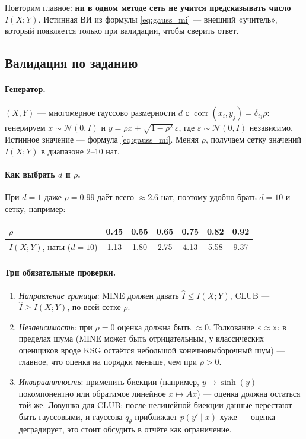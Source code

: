 \documentclass[11pt]{article}
\newcommand{\MI}{I(X;Y)}
\begin{document}
Повторим главное: \textbf{ни в одном методе сеть не учится предсказывать число $\MI$}. Истинная ВИ из формулы \eqref{eq:gauss_mi} — внешний «учитель», который появляется только при валидации, чтобы сверить ответ.

\subsection{Валидация по заданию}

\paragraph{Генератор.} $(X,Y)$ — многомерное гауссово размерности $d$ с $\operatorname{corr}(x_i,y_j)=\delta_{ij}\rho$: генерируем $x\sim\mathcal{N}(0,I)$ и $y=\rho x+\sqrt{1-\rho^2}\,\varepsilon$, где $\varepsilon\sim\mathcal{N}(0,I)$ независимо. Истинное значение — формула \eqref{eq:gauss_mi}. Меняя $\rho$, получаем сетку значений $\MI$ в диапазоне 2--10 нат.

\paragraph{Как выбрать $d$ и $\rho$.} При $d=1$ даже $\rho=0.99$ даёт всего $\approx2.6$ нат, поэтому удобно брать $d=10$ и сетку, например:

\begin{center}
\small
\begin{tabular}{@{}lcccccc@{}}
\toprule
$\rho$ & 0.45 & 0.55 & 0.65 & 0.75 & 0.82 & 0.92 \\
\midrule
$\MI$, наты ($d=10$) & 1.13 & 1.80 & 2.75 & 4.13 & 5.58 & 9.37 \\
\bottomrule
\end{tabular}
\end{center}

\paragraph{Три обязательные проверки.}

\begin{enumerate}[label=\arabic*.]
\item \emph{Направление границы}: MINE должен давать $\hat I\le\MI$, CLUB — $\hat I\ge\MI$, по всей сетке $\rho$.
\item \emph{Независимость}: при $\rho=0$ оценка должна быть $\approx0$. Толкование «$\approx$»: в пределах шума (MINE может быть отрицательным, у классических оценщиков вроде KSG остаётся небольшой конечновыборочный шум) — главное, что оценка на порядки меньше, чем при $\rho>0$.
\item \emph{Инвариантность}: применить биекции (например, $y\mapsto\sinh(y)$ покомпонентно или обратимое линейное $x\mapsto Ax$) — оценка должна остаться той же. Ловушка для CLUB: после нелинейной биекции данные перестают быть гауссовыми, и гауссова $q_\theta$ приближает $p(y'\mid x)$ хуже — оценка деградирует, это стоит обсудить в отчёте как ограничение.
\end{enumerate}
\end{document}

